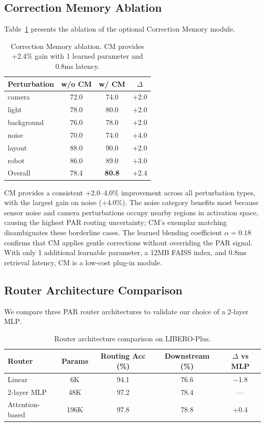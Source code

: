 \documentclass[conference]{article}
\newcommand{\liberoplus}{LIBERO-Plus}
\begin{document}
\subsection{Correction Memory Ablation}
\label{sec:cm}

Table~\ref{tab:cm} presents the ablation of the optional Correction Memory module.

\begin{table}[h]
\centering
\caption{Correction Memory ablation. CM provides +2.4\% gain with 1 learned parameter and 0.8ms latency.}
\label{tab:cm}
\small
\begin{tabular}{lccc}
\toprule
Perturbation & w/o CM & w/ CM & $\Delta$ \\
\midrule
camera & 72.0 & 74.0 & +2.0 \\
light & 78.0 & 80.0 & +2.0 \\
background & 76.0 & 78.0 & +2.0 \\
noise & 70.0 & 74.0 & +4.0 \\
layout & 88.0 & 90.0 & +2.0 \\
robot & 86.0 & 89.0 & +3.0 \\
\midrule
Overall & 78.4 & \textbf{80.8} & +2.4 \\
\bottomrule
\end{tabular}
\end{table}

CM provides a consistent +2.0--4.0\% improvement across all perturbation types, with the largest gain on noise (+4.0\%).
The noise category benefits most because sensor noise and camera perturbations occupy nearby regions in activation space, causing the highest PAR routing uncertainty; CM's exemplar matching disambiguates these borderline cases.
The learned blending coefficient $\alpha=0.18$ confirms that CM applies gentle corrections without overriding the PAR signal.
With only 1 additional learnable parameter, a 12MB FAISS index, and 0.8ms retrieval latency, CM is a low-cost plug-in module.

\subsection{Router Architecture Comparison}
\label{sec:router_arch}

We compare three PAR router architectures to validate our choice of a 2-layer MLP.

\begin{table}[h]
\centering
\caption{Router architecture comparison on \liberoplus{}.}
\label{tab:router}
\small
\begin{tabular}{lcccc}
\toprule
Router & Params & Routing Acc (\%) & Downstream (\%) & $\Delta$ vs MLP \\
\midrule
Linear & 6K & 94.1 & 76.6 & $-$1.8 \\
2-layer MLP & 48K & 97.2 & 78.4 & --- \\
Attention-based & 196K & 97.8 & 78.8 & +0.4 \\
\bottomrule
\end{tabular}
\end{table}
\end{document}
